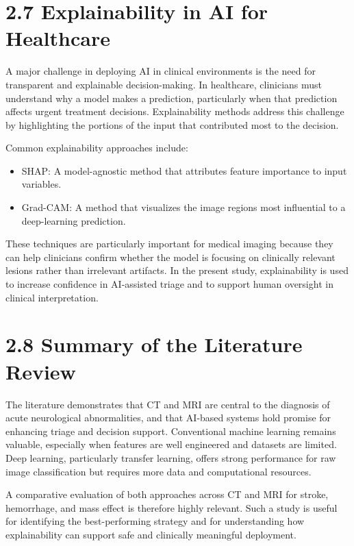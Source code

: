 \documentclass[12pt,a4paper]{report}
\begin{document}
\section{2.7 Explainability in AI for Healthcare}

A major challenge in deploying AI in clinical environments is the need for transparent and explainable decision-making. In healthcare, clinicians must understand why a model makes a prediction, particularly when that prediction affects urgent treatment decisions. Explainability methods address this challenge by highlighting the portions of the input that contributed most to the decision.

Common explainability approaches include:

\begin{itemize}
\item SHAP: A model-agnostic method that attributes feature importance to input variables.
\item Grad-CAM: A method that visualizes the image regions most influential to a deep-learning prediction.
\end{itemize}

These techniques are particularly important for medical imaging because they can help clinicians confirm whether the model is focusing on clinically relevant lesions rather than irrelevant artifacts. In the present study, explainability is used to increase confidence in AI-assisted triage and to support human oversight in clinical interpretation.

\section{2.8 Summary of the Literature Review}

The literature demonstrates that CT and MRI are central to the diagnosis of acute neurological abnormalities, and that AI-based systems hold promise for enhancing triage and decision support. Conventional machine learning remains valuable, especially when features are well engineered and datasets are limited. Deep learning, particularly transfer learning, offers strong performance for raw image classification but requires more data and computational resources.

A comparative evaluation of both approaches across CT and MRI for stroke, hemorrhage, and mass effect is therefore highly relevant. Such a study is useful for identifying the best-performing strategy and for understanding how explainability can support safe and clinically meaningful deployment.
\end{document}
